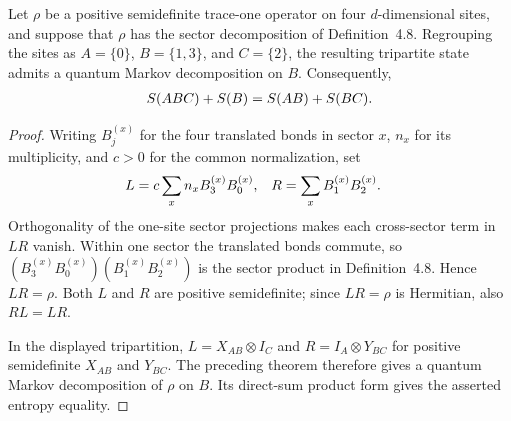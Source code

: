 \begin{lemma}
    \label{thm:mpdo_gsnnch_four_cycle_markov}
    \leanok
    Let $\rho$ be a positive semidefinite trace-one operator on four
    $d$-dimensional sites, and suppose that $\rho$ has the sector
    decomposition of Definition~4.8. Regrouping the sites as
    $A=\{0\}$, $B=\{1,3\}$, and $C=\{2\}$, the resulting tripartite
    state admits a quantum Markov decomposition on $B$. Consequently,
    \begin{align}
        S(ABC)+S(B)=S(AB)+S(BC).
        \notag
    \end{align}
\end{lemma}
\begin{proof}\leanok
    Writing $B_j^{(x)}$ for the four translated bonds in sector $x$, $n_x$
    for its multiplicity, and $c>0$ for the common normalization, set
    \begin{align}
        L & =c\sum_x n_x B_3^{(x)}B_0^{(x)},
          & R                                & =\sum_x B_1^{(x)}B_2^{(x)}.
        \notag
    \end{align}
    Orthogonality of the one-site sector projections makes each cross-sector
    term in $LR$ vanish. Within one sector the translated bonds
    commute, so $(B_3^{(x)}B_0^{(x)})(B_1^{(x)}B_2^{(x)})$ is the sector
    product in Definition~4.8. Hence $LR=\rho$. Both $L$ and $R$ are positive
    semidefinite; since $LR=\rho$ is Hermitian, also $RL=LR$.

    In the displayed tripartition, $L=X_{AB}\otimes I_C$ and
    $R=I_A\otimes Y_{BC}$ for positive semidefinite $X_{AB}$ and $Y_{BC}$.
    The preceding theorem therefore gives a quantum Markov decomposition of
    $\rho$ on $B$. Its direct-sum product form gives the asserted entropy
    equality.
\end{proof}

